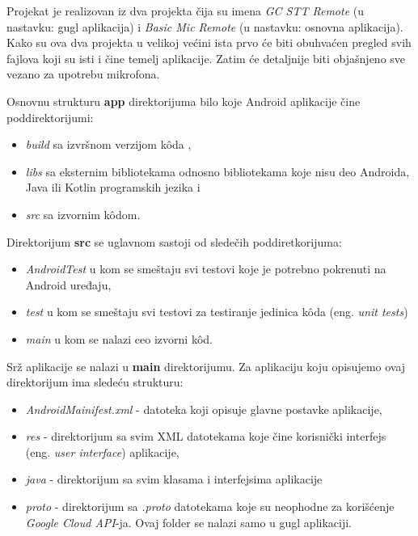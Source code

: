 \documentclass[implementacija.tex]{subfiles}
\begin{document}
Projekat je realizovan iz dva projekta čija su imena \textit{GC STT Remote} (u nastavku: gugl aplikacija) i \textit{Basic Mic Remote} (u nastavku: osnovna aplikacija). Kako su ova dva projekta u velikoj većini ista prvo će biti obuhvaćen pregled svih fajlova koji su isti i čine temelj aplikacije. Zatim će detaljnije biti objašnjeno sve vezano za upotrebu mikrofona. 

Osnovnu strukturu \textbf{app} direktorijuma bilo koje Android aplikacije čine poddirektorijumi: 

\begin{itemize}
\item \textit{build} sa izvršnom verzijom k\^{o}da ,
\item \textit{libs} sa eksternim bibliotekama odnosno bibliotekama koje nisu deo Androida, Java ili Kotlin programskih jezika i
\item \textit{src} sa izvornim k\^{o}dom.
\end{itemize}

 Direktorijum \textbf{src} se uglavnom sastoji od sledečih poddiretkorijuma: 
\begin{itemize}
\item \textit{AndroidTest} u kom se smeštaju svi testovi koje je potrebno pokrenuti na Android uređaju, 
\item \textit{test} u kom se smeštaju svi testovi za testiranje jedinica k\^{o}da (eng. \textit{unit tests})
\item \textit{main} u kom se nalazi ceo izvorni k\^{o}d.
\end{itemize}

Srž aplikacije se nalazi u \textbf{main} direktorijumu. Za aplikaciju koju opisujemo ovaj direktorijum ima sledeću strukturu:
\begin{itemize}
\item \textit{AndroidMainifest.xml} - datoteka koji opisuje glavne postavke aplikacije,
\item \textit{res} - direktorijum sa svim XML datotekama koje čine korisnički interfejs (eng. \textit{user interface}) aplikacije,
\item \textit{java} - direktorijum sa svim klasama i interfejsima aplikacije
\item \textit{proto} - direktorijum sa \textit{.proto} datotekama koje su neophodne za korišćenje \textit{Google Cloud API}-ja. Ovaj folder se nalazi samo u gugl aplikaciji.
\end{itemize}
\end{document}
